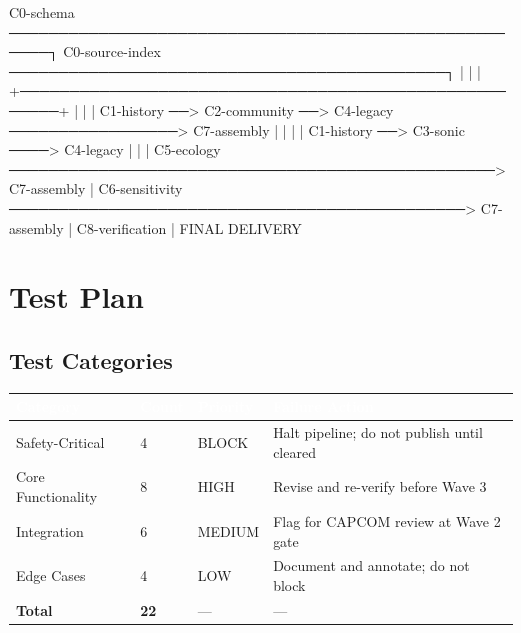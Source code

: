 \documentclass[11pt,letterpaper]{article}
\newcommand{\tableheader}[1]{\textbf{\sffamily\textcolor{white}{#1}}}
\begin{document}
\begin{asciibox}
C0-schema ──────────────────────────────────────────────────────┐
C0-source-index ────────────────────────────────────────────┐   |
                                                            |   |
     +──────────────────────────────────────────────────────+   |
     |                                                          |
  C1-history ──> C2-community ──> C4-legacy ─────────────────> C7-assembly
     |                  |              |                           |
  C1-history ──> C3-sonic ────> C4-legacy                         |
     |                                                            |
  C5-ecology ─────────────────────────────────────────────────> C7-assembly
                                                                   |
  C6-sensitivity ──────────────────────────────────────────────> C7-assembly
                                                                   |
                                                              C8-verification
                                                                   |
                                                            FINAL DELIVERY
\end{asciibox}

\section{Test Plan}

\subsection{Test Categories}

\begin{center}
\begin{tabularx}{\textwidth}{L{3cm}C{1.5cm}L{2cm}X}
\toprule
{}
\tableheader{Category} & \tableheader{Count} & \tableheader{Priority} & \tableheader{Failure Action} \\
\midrule
Safety-Critical & 4 & BLOCK & Halt pipeline; do not publish until cleared \\
Core Functionality & 8 & HIGH & Revise and re-verify before Wave 3 \\
Integration & 6 & MEDIUM & Flag for CAPCOM review at Wave 2 gate \\
Edge Cases & 4 & LOW & Document and annotate; do not block \\
\midrule
\textbf{Total} & \textbf{22} & --- & --- \\
\bottomrule
\end{tabularx}
\end{center}
\end{document}
